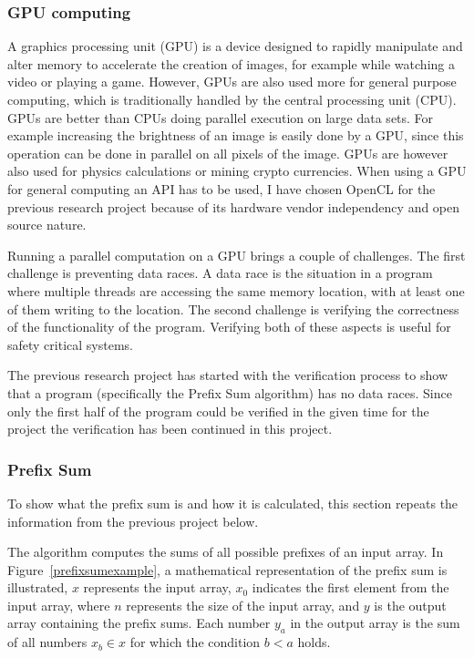 \documentclass[a4paper]{article}
\begin{document}
\subsubsection{GPU computing}
A graphics processing unit (GPU) is a device designed to rapidly manipulate and alter memory to accelerate the creation of images, for example while watching a video or playing a game. However, GPUs are also used more for general purpose computing, which is traditionally handled by the central processing unit (CPU). GPUs are better than CPUs doing parallel execution on large data sets. For example increasing the brightness of an image is easily done by a GPU, since this operation can be done in parallel on all pixels of the image. GPUs are however also used for physics calculations or mining crypto currencies. When using a GPU for general computing an API has to be used, I have chosen OpenCL for the previous research project because of its hardware vendor independency and open source nature. 

Running a parallel computation on a GPU brings a couple of challenges. The first challenge is preventing data races. A data race is the situation in a program where multiple threads are accessing the same memory location, with at least one of them writing to the location. The second challenge is verifying the correctness of the functionality of the program. Verifying both of these aspects is useful for safety critical systems.

The previous research project has started with the verification process to show that a program (specifically the Prefix Sum algorithm) has no data races. Since only the first half of the program could be verified in the given time for the project the verification has been continued in this project.

\subsubsection{Prefix Sum}
To show what the prefix sum is and how it is calculated, this section repeats the information from the previous project\cite{bachelorThesis} below.

The algorithm computes the sums of all possible prefixes of an input array. In Figure~\ref{prefixsumexample}, a mathematical representation of the prefix sum is illustrated, $x$ represents the input array, $x_0$ indicates the first element from the input array, where $n$ represents the size of the input array, and $y$ is the output array containing the prefix sums. Each number $y_a$ in the output array is the sum of all numbers $x_b \in x$ for which the condition $b<a$ holds.
\end{document}
